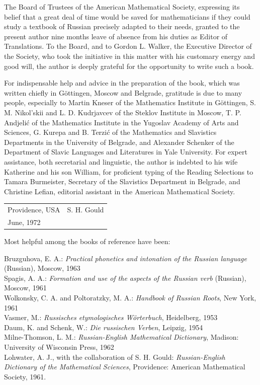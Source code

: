 The Board of Trustees of the American Mathematical Society, expressing its belief that a great deal of time would be saved for mathematicians if they could study a textbook of Russian precisely adapted to their needs, granted to the present author nine months leave of absence from his duties as Editor of Translations. To the Board, and to Gordon L. Walker, the Executive Director of the Society, who took the initiative in this matter with his customary energy and good will, the author is deeply grateful for the opportunity to write such a book.

For indispensable help and advice in the preparation of the book, which was written chiefly in Göttingen, Moscow and Belgrade, gratitude is due to many people, especially to Martin Kneser of the Mathematics Institute in Göttingen, S. M. Nikol'skii and L. D. Kudrjavcev of the Steklov Institute in Moscow, T. P. Andjelić of the Mathematics Institute in the Yugoslav Academy of Arts and Sciences, G. Kurepa and B. Terzić of the Mathematics and Slavistics Departments in the University of Belgrade, and Alexander Schenker of the Department of Slavic Languages and Literatures in Yale University. For expert assistance, both secretarial and linguistic, the author is indebted to his wife Katherine and his son William, for proficient typing of the Reading Selections to Tamara Burmeister, Secretary of the Slavistics Department in Belgrade, and Christine Lefian, editorial assistant in the American Mathematical Society.

\vspace{1.5em}
\noindent\begin{tabularx}{\textwidth}{@{}Xr@{}}
Providence, USA & S. H. Gould\\
June, 1972 &
\end{tabularx}

\vspace{1.4em}
{\small
\noindent Most helpful among the books of reference have been:

\begin{flushleft}
Bruzguhova, E. A.: \emph{Practical phonetics and intonation of the Russian language} (Russian), Moscow, 1963\\
Spagis, A. A.: \emph{Formation and use of the aspects of the Russian verb} (Russian), Moscow, 1961\\
Wolkonsky, C. A. and Poltoratzky, M. A.: \emph{Handbook of Russian Roots}, New York, 1961\\
Vasmer, M.: \emph{Russisches etymologisches Wörterbuch}, Heidelberg, 1953\\
Daum, K. and Schenk, W.: \emph{Die russischen Verben}, Leipzig, 1954\\
Milne-Thomson, L. M.: \emph{Russian-English Mathematical Dictionary}, Madison: University of Wisconsin Press, 1962\\
Lohwater, A. J., with the collaboration of S. H. Gould: \emph{Russian-English Dictionary of the Mathematical Sciences}, Providence: American Mathematical Society, 1961.
\end{flushleft}
}
